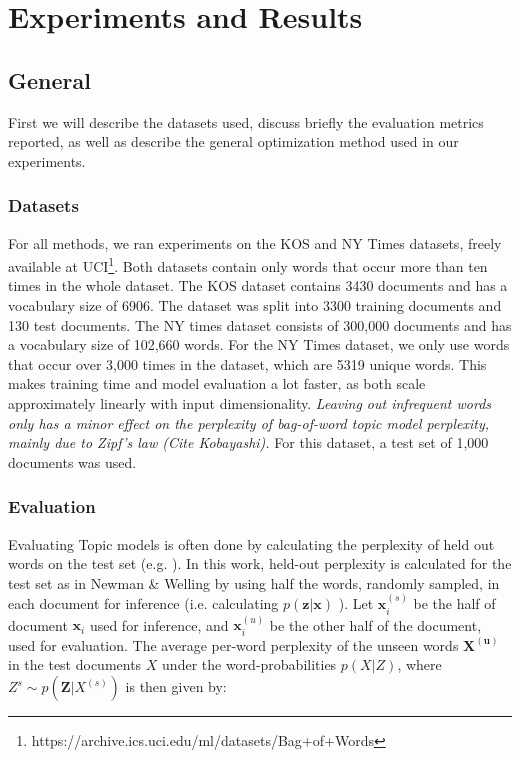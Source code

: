 \documentclass{report}
\begin{document}
\chapter{Experiments and Results}\label{experiments}
\section{General}
First we will describe the datasets used, discuss briefly the evaluation metrics reported, as well as describe the general optimization method used in our experiments.
	\subsection{Datasets}\label{datasets}
	For all methods, we ran experiments on the KOS and NY Times datasets, freely available at UCI\footnote{https://archive.ics.uci.edu/ml/datasets/Bag+of+Words}. Both datasets contain only words that occur more than ten times in the whole dataset. The KOS dataset contains 3430 documents and has a vocabulary size of 6906. The dataset was split into 3300 training documents and 130 test documents. The NY times dataset consists of 300,000 documents and has a vocabulary size of 102,660 words. For the NY Times dataset, we only use words that occur over 3,000 times in the dataset, which are 5319 unique words. This makes training time and model evaluation a lot faster, as both scale approximately linearly with input dimensionality. \textit{Leaving out infrequent words only has a minor effect on the perplexity of bag-of-word topic model perplexity, mainly due to Zipf's law (Cite Kobayashi).} For this dataset, a test set of 1,000 documents was used.
	\\
	\subsection{Evaluation}
	
	Evaluating Topic models is often done by calculating the perplexity of held out words on the test set (e.g. \cite{blei2003latent, newman2007distributed, ranganath2015deep}). In this work, held-out perplexity is calculated for the test set as in Newman \& Welling \cite{newman2007distributed} by using half the words, randomly sampled, in each document for inference (i.e. calculating $p(\mathbf{z}|\mathbf{x})$ ). Let $\mathbf{x}_{i}^{(s)}$ be the half of document $\mathbf{x}_i$ used for inference, and $\mathbf{x}_{i}^{(u)}$ be the other half of the document, used for evaluation. The average per-word perplexity of the unseen words $\mathbf{X^{(u)}}$ in the test documents $X$ under the word-probabilities $p(X|Z)$, where $Z^s \sim p(\mathbf{Z}|X^{(s)})$ is then given by:
	
\end{document}
